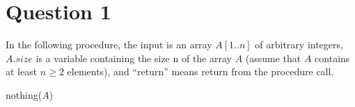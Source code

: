 \documentclass[11pt]{article}
\begin{document}
\section*{Question 1}
In the following procedure, the input is an array $A[1..n]$ of arbitrary integers, $A.size$ is a variable containing the size n of the array $A$ (assume that $A$ contains at least $n\geq 2$ elements), and “return” means return from the procedure call.

\begin{algorithm}[H]
  \DontPrintSemicolon

  \caption{\sc nothing($A$)}
\end{algorithm}
\end{document}
